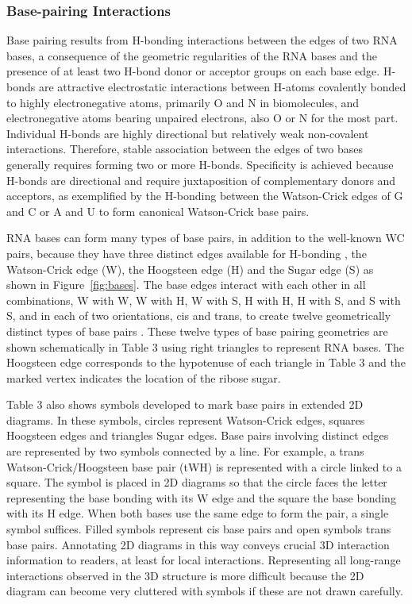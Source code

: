 \subsubsection{Base-pairing Interactions}

Base pairing results from H-bonding interactions between the edges of two RNA
bases, a consequence of the geometric regularities of the RNA bases and the
presence of at least two H-bond donor or acceptor groups on each base edge.
H-bonds are attractive electrostatic interactions between H-atoms covalently
bonded to highly electronegative atoms, primarily O and N in biomolecules, and
electronegative atoms bearing unpaired electrons, also O or N for the most part.
Individual H-bonds are highly directional but relatively weak non-covalent
interactions. Therefore, stable association between the edges of two bases
generally requires forming two or more H-bonds. Specificity is achieved because
H-bonds are directional and require juxtaposition of complementary donors and
acceptors, as exemplified by the H-bonding between the Watson-Crick edges of G
and C or A and U to form canonical Watson-Crick base pairs. 

RNA bases can form many types of base pairs, in addition to the well-known WC
pairs, because they have three distinct edges available for H-bonding
\cite{Leontis2001, Leontis2002f}, the Watson-Crick edge (W), the Hoogsteen edge
(H) and the Sugar edge (S) as shown in Figure~\ref{fig:bases}. The base edges
interact with each other in all combinations, W with W, W with H, W with S, H
with H, H with S, and S with S, and in each of two orientations, cis and trans,
to create twelve geometrically distinct types of base pairs \cite{Leontis2001}.
These twelve types of base pairing geometries are shown schematically in Table 3
using right triangles to represent RNA bases. The Hoogsteen edge corresponds to
the hypotenuse of each triangle in Table 3 and the marked vertex indicates the
location of the ribose sugar. 

Table 3 also shows symbols developed to mark base pairs in extended 2D diagrams.
In these symbols, circles represent Watson-Crick edges, squares Hoogsteen edges
and triangles Sugar edges. Base pairs involving distinct edges are represented
by two symbols connected by a line. For example, a trans Watson-Crick/Hoogsteen
base pair (tWH) is represented with a circle linked to a square. The symbol is
placed in 2D diagrams so that the circle faces the letter representing the base
bonding with its W edge and the square the base bonding with its H edge. When
both bases use the same edge to form the pair, a single symbol suffices. Filled
symbols represent cis base pairs and open symbols trans base pairs. Annotating
2D diagrams in this way conveys crucial 3D interaction information to readers,
at least for local interactions. Representing all long-range interactions
observed in the 3D structure is more difficult because the 2D diagram can become
very cluttered with symbols if these are not drawn carefully. 

